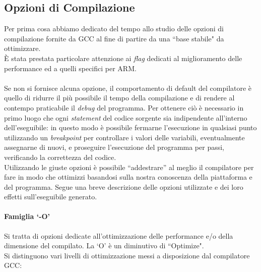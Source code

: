 \subsection{Opzioni di Compilazione}
Per prima cosa abbiamo dedicato del tempo allo studio delle opzioni di 
compilazione fornite da GCC al fine di partire da una ``base stabile" da 
ottimizzare.\\
\`E stata prestata particolare attenzione ai \emph{flag} dedicati al 
miglioramento delle performance ed a quelli specifici per ARM.
\\ \\
Se non si fornisce alcuna opzione, il comportamento di default del compilatore 
è quello di ridurre il più possibile il tempo della compilazione e di rendere 
al contempo praticabile il \emph{debug} del programma. Per ottenere ciò è 
necessario in primo luogo che ogni \emph{statement} del codice sorgente sia 
indipendente all'interno dell'eseguibile: in questo modo è possibile fermarne 
l'esecuzione in qualsiasi punto utilizzando un \emph{breakpoint} per 
controllare i valori delle variabili, eventualmente assegnarne di nuovi, e 
proseguire l'esecuzione del programma per passi, verificando la correttezza del 
codice. \\
Utilizzando le giuste opzioni è possibile ``addestrare'' al meglio il 
compilatore per fare in modo che ottimizzi basandosi sulla nostra conoscenza 
della piattaforma e del programma.
Segue una breve descrizione delle opzioni utilizzate e dei loro 
effetti sull'eseguibile generato.

\paragraph{Famiglia `-O' \\}
Si tratta di opzioni dedicate all'ottimizzazione delle performance e/o della 
dimensione del compilato. La `O' è un diminutivo di ``Optimize".\\
Si distinguono vari livelli di ottimizzazione messi a disposizione dal 
compilatore GCC:

